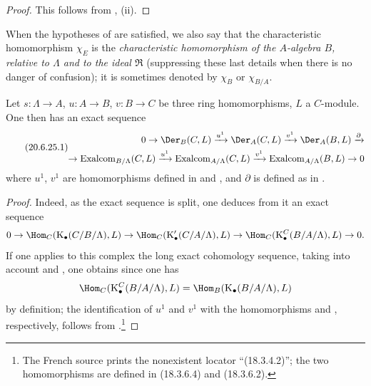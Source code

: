 \begin{proof}
This follows from , (ii).
\end{proof}

\begin{env}[20.6.24]
\label{0.20.6.24}
When the hypotheses of  are satisfied, we also say that the characteristic homomorphism $\chi_E$ is the \emph{characteristic homomorphism of the $A$-algebra $B$, relative to $\Lambda$ and to the ideal $\mathfrak{R}$} (suppressing these last details when there is no danger of confusion); it is sometimes denoted by $\chi_B$ or $\chi_{B/A}$.
\end{env}

\begin{proposition}[20.6.25]
\label{0.20.6.25}
Let $s:\Lambda\to A$, $u:A\to B$, $v:B\to C$ be three ring homomorphisms, $L$ a $C$-module.
One then has an exact sequence
\begin{equation}
\tag{20.6.25.1}
  \label{0.20.6.25.1}
\begin{split}
  0\to\Der_B(C,L)\xrightarrow{u^1}\Der_A(C,L)\xrightarrow{v^1}\Der_A(B,L)\xrightarrow{\partial} \\
  \to\operatorname{Exalcom}_{B/\Lambda}(C,L)\xrightarrow{u^1}\operatorname{Exalcom}_{A/\Lambda}(C,L)\xrightarrow{v^1}\operatorname{Exalcom}_{A/\Lambda}(B,L)\to 0
\end{split}
\end{equation}
where $u^1$, $v^1$ are homomorphisms defined in  and , and $\partial$ is defined as in .
\end{proposition}

\begin{proof}
Indeed, as the exact sequence  is split, one deduces from it an exact sequence
\[
  0\to\Hom_C(\mathrm{K}_\bullet(C/B/\Lambda),L)\to\Hom_C(\mathrm{K}'_\bullet(C/A/\Lambda),L)\to\Hom_C(\mathrm{K}^C_\bullet(B/A/\Lambda),L)\to 0.
\]
If one applies to this complex the long exact cohomology sequence, taking into account  and , one obtains  since one has
\[
  \Hom_C(\mathrm{K}^C_\bullet(B/A/\Lambda),L)=\Hom_B(\mathrm{K}_\bullet(B/A/\Lambda),L)
\]
by definition; the identification of $u^1$ and $v^1$ with the homomorphisms  and , respectively, follows from .\footnote{The French source prints the nonexistent locator ``(18.3.4.2)''; the two homomorphisms are defined in (18.3.6.4) and (18.3.6.2).}
\end{proof}

